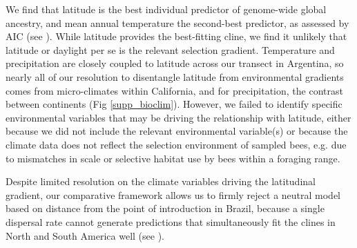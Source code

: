 We find that latitude is the best individual predictor of genome-wide global ancestry, and mean annual temperature the second-best predictor, as assessed by AIC (see ). While latitude provides the best-fitting cline, we find it unlikely that latitude or daylight per se is the relevant selection gradient. Temperature and precipitation are closely coupled to latitude across our transect in Argentina, so nearly all of our resolution to disentangle latitude from environmental gradients comes from micro-climates within California, and for precipitation, the contrast between continents (Fig \ref{supp_bioclim}). However, we failed to identify specific environmental variables that may be driving the relationship with latitude, either because we did not include the relevant environmental variable(s) or because the climate data does not reflect the selection environment of sampled bees, e.g. due to mismatches in scale or selective habitat use by bees within a foraging range.

Despite limited resolution on the climate variables driving the latitudinal gradient, our comparative framework allows us to firmly reject a neutral model based on distance from the point of introduction in Brazil, because a single dispersal rate cannot generate predictions that simultaneously fit the clines in North and South America well (see ).

